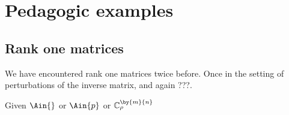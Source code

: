 \section{Pedagogic examples}

\subsection{Rank one matrices}
We have encountered rank one matrices twice before. Once in the setting of perturbations of the inverse matrix, and again ???.

Given $\Ain{}$ or $\Ain{p}$ or $\mathbb{C}^{\by{m}{n}}_{\rho}$



\endinput